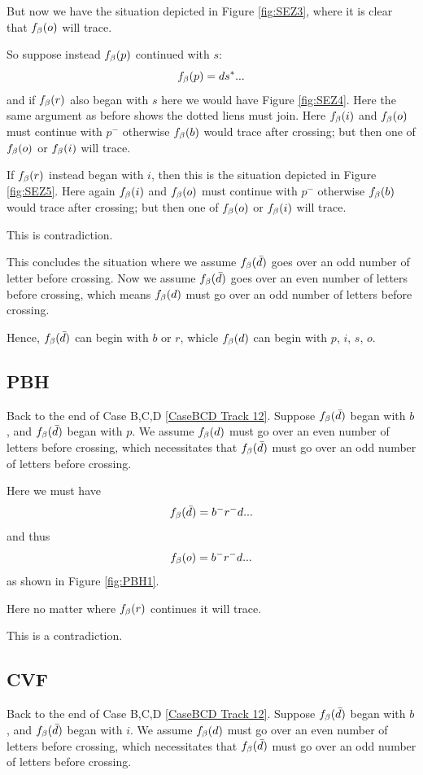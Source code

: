 But now we have the situation depicted in Figure \ref{fig:SEZ3}, where it is clear that $f_\beta(o)$ will trace.

So suppose instead $f_\beta(p)$ continued with $s$:
\[
f_\beta(p) = d s^*...
\]
and if $f_\beta(r)$ also began with $s$ here we would have Figure \ref{fig:SEZ4}. Here the same argument as before shows the dotted liens must join. Here $f_\beta(i)$ and $f_\beta(o)$ must continue with $p^-$ otherwise $f_\beta(b)$ would trace after crossing; but then one of $f_\beta(o)$ or $f_\beta(i)$ will trace.

If $f_\beta(r)$ instead began with $i$, then this is the situation depicted in Figure \ref{fig:SEZ5}. Here again $f_\beta(i)$ and $f_\beta(o)$ must continue with $p^-$ otherwise $f_\beta(b)$ would trace after crossing; but then one of $f_\beta(o)$ or $f_\beta(i)$ will trace.

This is contradiction.

This concludes the situation where we assume $f_\beta(\bar{d})$ goes over an odd number of letter before crossing. Now we assume $f_\beta(\bar{d})$ goes over an even number of letters before crossing, which means $f_\beta(d)$ must go over an odd number of letters before crossing.

Hence, $f_\beta(\bar{d})$ can begin with $b$ or $r$, whicle $f_\beta(d)$ can begin with $p$, $i$, $s$, $o$.

\subsection{PBH}\label{PBH}
Back to the end of Case B,C,D \ref{CaseBCD Track 12}.
Suppose $f_\beta(\bar{d})$ began with $b$, and $f_\beta(\bar{d})$ began with $p$. We assume $f_\beta(d)$ must go over an even number of letters before crossing, which necessitates that $f_\beta(\bar{d})$ must go over an odd number of letters before crossing.

Here we must have
\[
f_\beta(\bar{d}) = b^- r^- d...
\]
and thus
\[
f_\beta(o) = b^- r^- d...
\]
as shown in Figure \ref{fig:PBH1}.

Here no matter where $f_\beta(r)$ continues it will trace.

This is a contradiction.

\subsection{CVF}\label{CVF}
Back to the end of Case B,C,D \ref{CaseBCD Track 12}.
Suppose $f_\beta(\bar{d})$ began with $b$, and $f_\beta(\bar{d})$ began with $i$. We assume $f_\beta(d)$ must go over an even number of letters before crossing, which necessitates that $f_\beta(\bar{d})$ must go over an odd number of letters before crossing.


